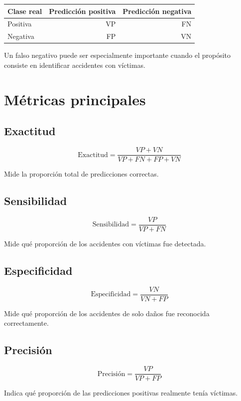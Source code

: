 \documentclass[
  spanish,
  10.5pt,
  letterpaper,
  openany,
  headings=big]{scrbook}
\newcounter{none} %
\begin{document}
{\def\LTcaptype{none} %
\begin{longtable}[]{@{}lrr@{}}
\toprule\noalign{}
Clase real & Predicción positiva & Predicción negativa \\
\midrule\noalign{}
\endhead
\bottomrule\noalign{}
\endlastfoot
Positiva & VP & FN \\
Negativa & FP & VN \\
\end{longtable}
}

Un falso negativo puede ser especialmente importante cuando el propósito
consiste en identificar accidentes con víctimas.

\section{Métricas principales}\label{muxe9tricas-principales}

\subsection{Exactitud}\label{exactitud}

\[
\text{Exactitud}=\frac{VP+VN}{VP+FN+FP+VN}
\]

Mide la proporción total de predicciones correctas.

\subsection{Sensibilidad}\label{sensibilidad}

\[
\text{Sensibilidad}=\frac{VP}{VP+FN}
\]

Mide qué proporción de los accidentes con víctimas fue detectada.

\subsection{Especificidad}\label{especificidad}

\[
\text{Especificidad}=\frac{VN}{VN+FP}
\]

Mide qué proporción de los accidentes de solo daños fue reconocida
correctamente.

\subsection{Precisión}\label{precisiuxf3n}

\[
\text{Precisión}=\frac{VP}{VP+FP}
\]

Indica qué proporción de las predicciones positivas realmente tenía
víctimas.
\end{document}
